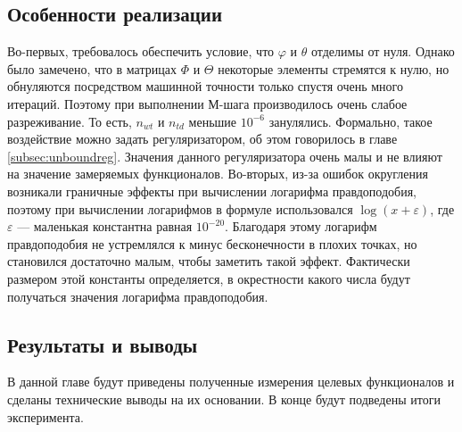 \documentclass[12pt]{article}
\renewcommand{\phi}{\varphi}
\begin{document}
\subsection{Особенности реализации}
\label{technical}
Во-первых, требовалось обеспечить условие, что $\phi$ и $\theta$ отделимы от нуля. Однако было замечено, что в матрицах $\Phi$ и $\Theta$ некоторые элементы стремятся к нулю, но обнуляются посредством машинной точности только спустя очень много итераций. Поэтому при выполнении М-шага производилось очень слабое разреживание. То есть, $n_{wt}$ и $n_{td}$ меньшие $10^{-6}$ занулялись. Формально, такое воздействие можно задать регуляризатором, об этом говорилось в главе \ref{subsec:unboundreg}. Значения данного регуляризатора очень малы и не влияют на значение замеряемых функционалов.
Во-вторых, из-за ошибок округления возникали граничные эффекты при вычислении логарифма правдоподобия, поэтому при вычислении логарифмов в формуле использовался $\log(x + \varepsilon)$, где $\varepsilon$ ---  маленькая константна равная $10^{-20}$. Благодаря этому логарифм правдоподобия не устремлялся к минус бесконечности в плохих точках, но становился достаточно малым, чтобы заметить такой эффект. Фактически размером этой константы определяется, в окрестности какого числа будут получаться  значения логарифма правдоподобия.
\subsection{Результаты и выводы}
В данной главе будут приведены полученные измерения целевых функционалов и сделаны технические  выводы на их основании. В конце будут подведены итоги эксперимента.
\end{document}
